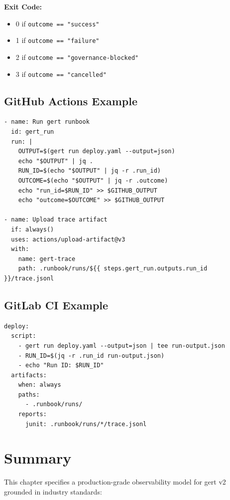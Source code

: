 \textbf{Exit Code:}
\begin{itemize}
  \item 0 if \texttt{outcome == "success"}
  \item 1 if \texttt{outcome == "failure"}
  \item 2 if \texttt{outcome == "governance-blocked"}
  \item 3 if \texttt{outcome == "cancelled"}
\end{itemize}

\subsection{GitHub Actions Example}

\begin{verbatim}
- name: Run gert runbook
  id: gert_run
  run: |
    OUTPUT=$(gert run deploy.yaml --output=json)
    echo "$OUTPUT" | jq .
    RUN_ID=$(echo "$OUTPUT" | jq -r .run_id)
    OUTCOME=$(echo "$OUTPUT" | jq -r .outcome)
    echo "run_id=$RUN_ID" >> $GITHUB_OUTPUT
    echo "outcome=$OUTCOME" >> $GITHUB_OUTPUT

- name: Upload trace artifact
  if: always()
  uses: actions/upload-artifact@v3
  with:
    name: gert-trace
    path: .runbook/runs/${{ steps.gert_run.outputs.run_id }}/trace.jsonl
\end{verbatim}

\subsection{GitLab CI Example}

\begin{verbatim}
deploy:
  script:
    - gert run deploy.yaml --output=json | tee run-output.json
    - RUN_ID=$(jq -r .run_id run-output.json)
    - echo "Run ID: $RUN_ID"
  artifacts:
    when: always
    paths:
      - .runbook/runs/
    reports:
      junit: .runbook/runs/*/trace.jsonl
\end{verbatim}

\section{Summary}

This chapter specifies a production-grade observability model for gert v2 grounded in industry standards:

